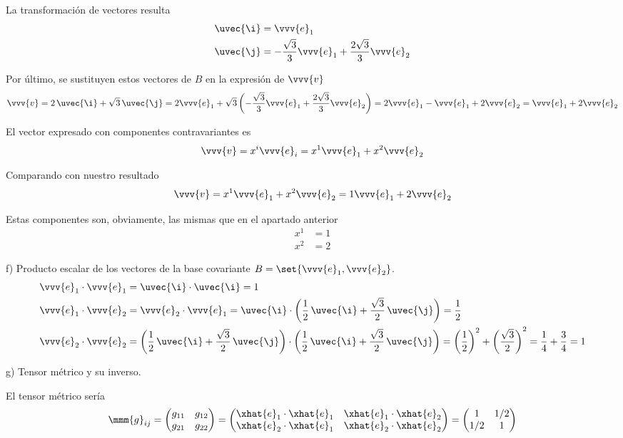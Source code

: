 La transformación de vectores resulta
\begin{align*}
  \uvec{\i} &= \vvv{e}_1\\
  \uvec{\j} &= -\dfrac{\sqrt{3}}{3}\vvv{e}_1 + \dfrac{2\sqrt{3}}{3}\vvv{e}_2
\end{align*}

Por último, se sustituyen estos vectores de $B$ en la expresión de $\vvv{v}$
\[
  \vvv{v}
  =
  2\,\uvec{\i} + \sqrt{3}\,\uvec{\j}
  = 2 \vvv{e}_1
  +\sqrt{3}\left(-\dfrac{\sqrt{3}}{3}\vvv{e}_1+\dfrac{2\sqrt{3}}{3}\vvv{e}_2\right)
  =
  2\vvv{e}_1 - \vvv{e}_1 + 2\vvv{e}_2
  = \vvv{e}_1 + 2\vvv{e}_2 
\]

El vector expresado con componentes contravariantes es
\[
  \vvv{v} = x^i\vvv{e}_i = x^1\vvv{e}_1 + x^2\vvv{e}_2
\]

Comparando con nuestro resultado
\[
  \vvv{v} = x^1\vvv{e}_1 + x^2\vvv{e}_2 = 1\vvv{e}_1 + 2\vvv{e}_2
\]

Estas componentes son, obviamente, las mismas que en el apartado anterior
\begin{align*}
  x^1 &= 1\\
  x^2 &= 2
\end{align*}

\noindent
f) Producto escalar de los vectores de la base covariante $B=\set{\vvv{e}_1,\vvv{e}_2}$.
\begin{align*}
  \vvv{e}_1\cdot\vvv{e}_1
  &=
    \uvec{\i}\cdot\uvec{\i}
    = 1\\
  \vvv{e}_1\cdot\vvv{e}_2
  &=
    \vvv{e}_2\cdot\vvv{e}_1
    = \uvec{\i}\cdot\left(\dfrac{1}{2}\,\uvec{\i}+\dfrac{\sqrt{3}}{2}\,\uvec{\j}\right)
    = \dfrac{1}{2}\\
  \vvv{e}_2\cdot\vvv{e}_2
  &=
    \left(\dfrac{1}{2}\,\uvec{\i}+\dfrac{\sqrt{3}}{2}\,\uvec{\j}\right)
    \cdot
    \left(\dfrac{1}{2}\,\uvec{\i}+\dfrac{\sqrt{3}}{2}\,\uvec{\j}\right)
    = \left(\dfrac{1}{2}\right)^2 + \left(\dfrac{\sqrt{3}}{2}\right)^2
    = \dfrac{1}{4} + \dfrac{3}{4}
    = 1
\end{align*}

\noindent
g) Tensor métrico y su inverso.

El tensor métrico sería
\[
  \mmm{g}_{ij}
  =
  \begin{pmatrix}
    g_{11} & g_{12}\\
    g_{21} & g_{22}
  \end{pmatrix}
  =
  \begin{pmatrix}
    \xhat{e}_1\cdot\xhat{e}_1 & \xhat{e}_1\cdot\xhat{e}_2\\
    \xhat{e}_2\cdot\xhat{e}_1 & \xhat{e}_2\cdot\xhat{e}_2
  \end{pmatrix}
  =
  \begin{pmatrix}
    1 & 1/2\\
    1/2 & 1
  \end{pmatrix}
\]


